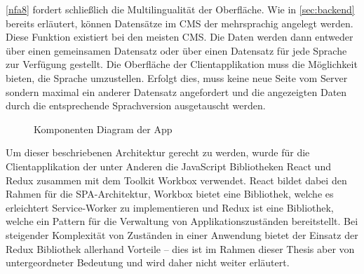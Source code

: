 \ref{nfa8} fordert schließlich die Multilingualität der Oberfläche. Wie in \autoref{sec:backend} 
bereits erläutert, können Datensätze im CMS der \shst{} mehrsprachig angelegt werden. Diese Funktion
existiert bei den meisten CMS. Die Daten werden dann entweder über einen gemeinsamen Datensatz oder über einen
Datensatz für jede Sprache zur Verfügung gestellt. Die Oberfläche der Clientapplikation muss die Möglichkeit
bieten, die Sprache umzustellen. Erfolgt dies, muss keine neue Seite vom Server sondern maximal ein anderer
Datensatz angefordert und die angezeigten Daten durch die entsprechende Sprachversion ausgetauscht werden.\\

\begin{figure}
    \centering
    
    \caption{Komponenten Diagram der \shst{} App}
    \label{fig:ss-app-class-diagram}
\end{figure}

Um dieser beschriebenen Architektur gerecht zu werden, wurde für die Clientapplikation der \shst{} 
unter Anderen die JavaScript Bibliotheken React \cite{react} und Redux \cite{redux} zusammen mit dem 
Toolkit Workbox \cite{workbox} verwendet. React bildet dabei
den Rahmen für die SPA-Architektur, Workbox bietet eine Bibliothek, welche es erleichtert 
Service-Worker zu implementieren und Redux ist eine Bibliothek, welche ein Pattern für die Verwaltung 
von Applikationszuständen bereitstellt. Bei steigender Komplexität von Zuständen in einer Anwendung 
bietet der Einsatz der Redux Bibliothek allerhand Vorteile 
-- dies ist im Rahmen dieser Thesis aber von untergeordneter Bedeutung und wird daher
nicht weiter erläutert.\\

